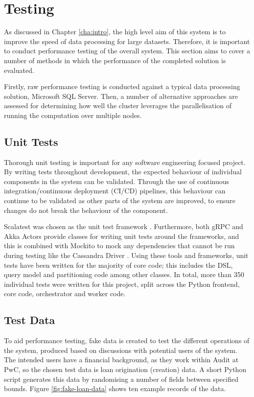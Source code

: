 \chapter{Testing}\label{cha:testing}


As discussed in Chapter \ref{cha:intro}, the high level aim of this system is to improve the speed of data processing for large datasets. Therefore, it is important to conduct performance testing of the overall system. This section aims to cover a number of methods in which the performance of the completed solution is evaluated.

Firstly, raw performance testing is conducted against a typical data processing solution, Microsoft SQL Server. Then, a number of alternative approaches are assessed for determining how well the cluster leverages the parallelisation of running the computation over multiple nodes.

\section{Unit Tests}
Thorough unit testing is important for any software engineering focused project. By writing tests throughout development, the expected behaviour of individual components in the system can be validated. Through the use of continuous integration/continuous deployment (CI/CD) pipelines, this behaviour can continue to be validated as other parts of the system are improved, to ensure changes do not break the behaviour of the component. 

Scalatest was chosen as the unit test framework \cite{scalatestuserguide}. Furthermore, both gRPC and Akka Actors provide classes for writing unit tests around the frameworks, and this is combined with Mockito to mock any dependencies that cannot be run during testing like the Cassandra Driver \cite{scalatestplusmockito, datastaxjavadriver}. Using these tools and frameworks, unit tests have been written for the majority of core code; this includes the DSL, query model and partitioning code among other classes. In total, more than 350 individual tests were written for this project, split across the Python frontend, core code, orchestrator and worker code.

\section{Test Data}
To aid performance testing, fake data is created to test the different operations of the system, produced based on discussions with potential users of the system. The intended users have a financial background, as they work within Audit at PwC, so the chosen test data is loan origination (creation) data. A short Python script generates this data by randomising a number of fields between specified bounds. Figure \ref{fig:fake-loan-data} shows ten example records of the data.

